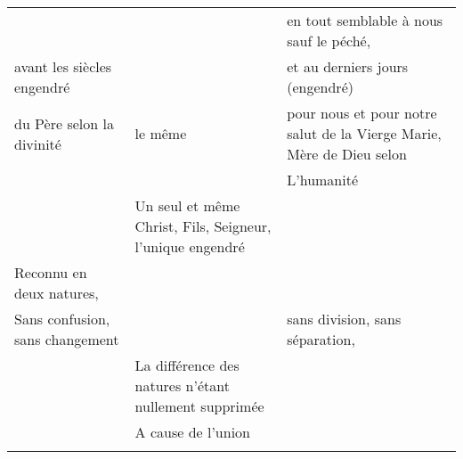 \begin{table}[h!]
\begin{tabular}{p{}p{}p{}}
                                                                       &                                                                                          & en tout semblable à nous sauf le péché,                              \\
avant les siècles   engendré                                           &                                                                                          & et au derniers jours (engendré)                                      \\
du Père selon la divinité                                              & le même                                                                                  & pour nous et pour notre salut de la Vierge Marie, Mère de Dieu selon \\
                                                                       &                                                                                          & L’humanité                                                           \\
\multicolumn{1}{l}{}                                                   & \multicolumn{1}{p{.3\textwidth}}{Un seul et même Christ, Fils, Seigneur, l’unique engendré}            & \multicolumn{1}{l}{}                                                 \\
Reconnu en deux natures,                                               &                                                                                          &                                                                      \\
Sans confusion, sans changement                                        &                                                                                          & sans division, sans séparation,                                      \\
                                                                       & La différence des natures n’étant nullement supprimée                                    &                                                                      \\
                                                                       & A cause de l’union                                                                       &                                                                      \\
                                                                       \\

\end{tabular}
\end{table}
